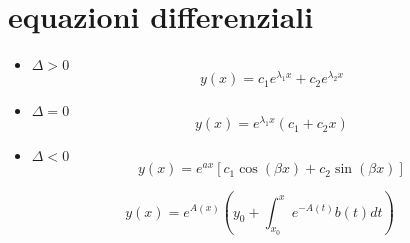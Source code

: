 \documentclass{article}
\begin{document}
\section{equazioni differenziali}
\begin{itemize}
	\item $\Delta>0$
		\begin{equation*}
			\boxed{y(x)=c_1e^{\lambda_1x}+c_2e^{\lambda_2x}}
		\end{equation*}
	\item $\Delta=0$
		\begin{equation*}
			\boxed{y(x)=e^{\lambda_1x}\left(c_1+c_2x\right)}
		\end{equation*}
	\item $\Delta<0$
		\begin{equation*}
			\boxed{y(x)=e^{ax}\left[c_1\cos(\beta x)+c_2\sin(\beta x)\right]}
		\end{equation*}
\end{itemize}
\begin{equation*}
	y(x)=e^{A(x)}\left(y_0+\int^x_{x_0}e^{-A(t)}b(t)dt\right)
\end{equation*}
\end{document}
